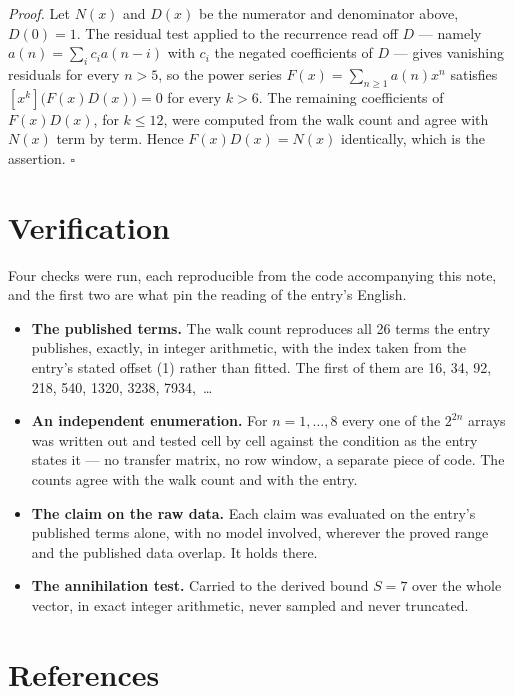 \documentclass[11pt]{article}
\theoremstyle{definition}
\begin{document}
{\itshape Proof.} Let $N(x)$ and $D(x)$ be the numerator and denominator above, $D(0)=1$. The residual test applied to the recurrence read off $D$ --- namely $a(n) = \sum_i c_i a(n-i)$ with $c_i$ the negated coefficients of $D$ --- gives vanishing residuals for every $n > 5$, so the power series $F(x)=\sum_{n\ge 1}a(n)x^n$ satisfies $[x^k]\bigl(F(x)D(x)\bigr) = 0$ for every $k > 6$. The remaining coefficients of $F(x)D(x)$, for $k \le 12$, were computed from the walk count and agree with $N(x)$ term by term. Hence $F(x)D(x) = N(x)$ identically, which is the assertion. $\square$

\section{Verification}

Four checks were run, each reproducible from the code accompanying this note, and the first two are what pin the reading of the entry's English.

\begin{itemize}

\item {\bfseries The published terms.} The walk count reproduces all 26 terms the entry publishes, exactly, in integer arithmetic, with the index taken from the entry's stated offset (1) rather than fitted. The first of them are 16, 34, 92, 218, 540, 1320, 3238, 7934,~\dots

\item {\bfseries An independent enumeration.} For $n = 1,\dots,8$ every one of the $2^{2n}$ arrays was written out and tested cell by cell against the condition as the entry states it --- no transfer matrix, no row window, a separate piece of code. The counts agree with the walk count and with the entry.

\item {\bfseries The claim on the raw data.} Each claim was evaluated on the entry's published terms alone, with no model involved, wherever the proved range and the published data overlap. It holds there.

\item {\bfseries The annihilation test.} Carried to the derived bound $S = 7$ over the whole vector, in exact integer arithmetic, never sampled and never truncated.

\end{itemize}

\section{References}
\end{document}
